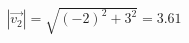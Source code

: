 \documentclass[preview]{standalone}
\begin{document}
\begin{align*}
|\vec{v_2}| = \sqrt{(-2)^2 + 3^2} = 3.61
\end{align*}
\end{document}
